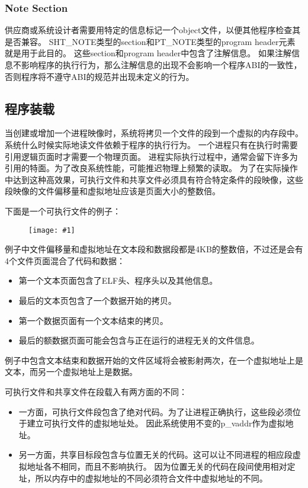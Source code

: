 \documentclass[a4paper,left=2.5cm,right=2.5cm,11pt]{article}
\newcommand{\fic}[1]{\begin{figure}[H]
		\center
		\texttt{[image: \#1]}
	\end{figure}}
\begin{document}
\subsubsection{Note Section}
	供应商或系统设计者需要用特定的信息标记一个object文件，以便其他程序检查其是否兼容。
	SHT\_NOTE类型的section和PT\_NOTE类型的program header元素就是用于此目的。
	这些section和program header中包含了注解信息。
	如果注解信息不影响程序的执行行为，那么注解信息的出现不会影响一个程序ABI的一致性，否则程序将不遵守ABI的规范并出现未定义的行为。\par

\subsection{程序装载}
	当创建或增加一个进程映像时，系统将拷贝一个文件的段到一个虚拟的内存段中。
	系统什么时候实际地读文件依赖于程序的执行行为。
	一个进程只有在执行时需要引用逻辑页面时才需要一个物理页面。
	进程实际执行过程中，通常会留下许多为引用的特面。为了改良系统性能，可能推迟物理上频繁的读取。
	为了在实际操作中达到这种高效果，可执行文件和共享文件必须具有符合特定条件的段映像，这些段映像的文件偏移量和虚拟地址应该是页面大小的整数倍。\par

	下面是一个可执行文件的例子：
	\fic{24.png}

	例子中文件偏移量和虚拟地址在文本段和数据段都是4KB的整数倍，不过还是会有4个文件页面混合了代码和数据：
	\begin{itemize}
		\item 第一个文本页面包含了ELF头、程序头以及其他信息。
		\item 最后的文本页包含了一个数据开始的拷贝。
		\item 第一个数据页面有一个文本结束的拷贝。
		\item 最后的额数据页面可能会包含与正在运行的进程无关的文件信息。
	\end{itemize}

	例子中包含文本结束和数据开始的文件区域将会被影射两次，在一个虚拟地址上是文本，而另一个虚拟地址上是数据。\par

	可执行文件和共享文件在段载入有两方面的不同：
	\begin{itemize}
		\item 一方面，可执行文件段包含了绝对代码。为了让进程正确执行，这些段必须位于建立可执行文件的虚拟地址处。
			  因此系统使用不变的p\_vaddr作为虚拟地址。
		\item 另一方面，共享目标段包含与位置无关的代码。这可以让不同进程的相应段虚拟地址各不相同，而且不影响执行。
			  因为位置无关的代码在段间使用相对定址，所以内存中的虚拟地址的不同必须符合文件中虚拟地址的不同。
	\end{itemize}
\end{document}
